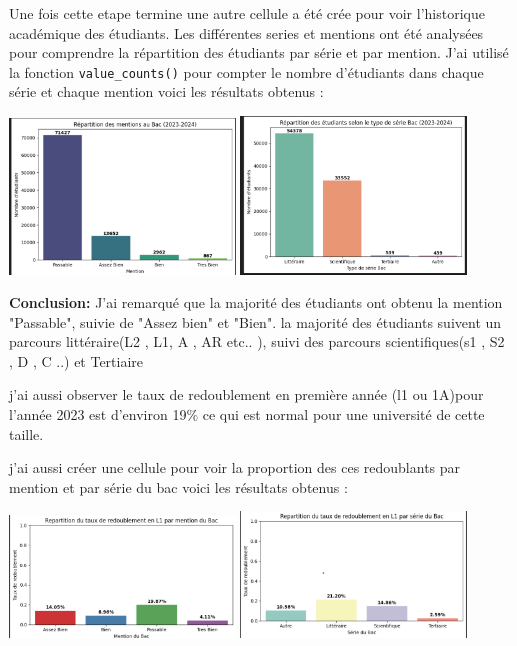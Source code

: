 Une fois cette etape termine une autre cellule a été crée pour voir l'historique académique des étudiants. Les différentes series et mentions ont été analysées pour comprendre la répartition des étudiants par série et par mention. J'ai utilisé la fonction \texttt{value\_counts()} pour compter le nombre d'étudiants dans chaque série et chaque mention 
voici les résultats obtenus :
\begin{center}
    \centering
    \includegraphics[width=0.45\textwidth]{image/6.png}
    \hspace{0.05\textwidth}
    \includegraphics[width=0.45\textwidth]{image/7.png}
\end{center}
\textcolor{red}{\faInfoCircle}\textbf{Conclusion:}  J'ai remarqué que la majorité des étudiants ont obtenu la mention "Passable", suivie de "Assez bien" et "Bien". 
la majorité des étudiants suivent un parcours littéraire(L2 , L1, A , AR etc.. ), suivi des parcours scientifiques(s1 , S2  , D , C ..) et Tertiaire  

j'ai aussi observer le taux de redoublement en première année (l1 ou 1A)pour l'année 2023 est d'environ 19\% ce qui est normal pour une université de cette taille.

j'ai aussi créer une cellule pour voir la proportion des ces  redoublants  par mention et par série du bac voici les résultats obtenus :
\begin{center}
    \centering
    \includegraphics[width=0.45\textwidth]{image/8.png}
    \hspace{0.05\textwidth}
    \includegraphics[width=0.45\textwidth]{image/9.png}
\end{center} 

